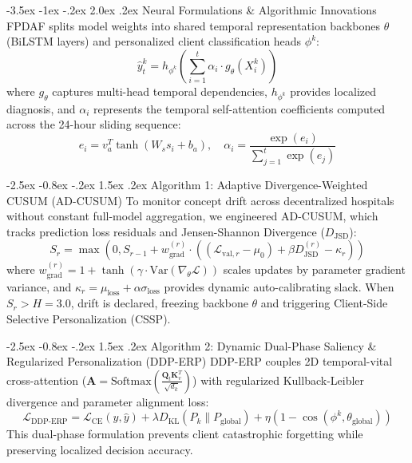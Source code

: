 \documentclass[11pt, a4paper]{article}
\makeatletter
\renewcommand\section{\@startsection {section}{1}{\z@}%
                                   {-3.5ex \@plus -1ex \@minus -.2ex}%
                                   {2.0ex \@plus.2ex}%
                                   {\normalfont\large\bfseries\color{amritaMaroon}}}
\renewcommand\subsection{\@startsection {subsection}{2}{\z@}%
                                   {-2.5ex \@plus -0.8ex \@minus -.2ex}%
                                   {1.5ex \@plus.2ex}%
                                   {\normalfont\normalsize\bfseries\color{slateNavy}}}
\makeatother
\begin{document}
\section{Neural Formulations \& Algorithmic Innovations}
FPDAF splits model weights into shared temporal representation backbones $\theta$ (BiLSTM layers) and personalized client classification heads $\phi^k$:
\begin{equation}
\hat{y}_t^k = h_{\phi^k} \left( \sum_{i=1}^{t} \alpha_i \cdot g_{\theta}(X_{i}^k) \right)
\end{equation}
where $g_{\theta}$ captures multi-head temporal dependencies, $h_{\phi^k}$ provides localized diagnosis, and $\alpha_i$ represents the temporal self-attention coefficients computed across the 24-hour sliding sequence:
\begin{equation}
e_i = v_a^T \tanh(W_s s_i + b_a), \quad \alpha_i = \frac{\exp(e_i)}{\sum_{j=1}^{t} \exp(e_j)}
\end{equation}

\subsection{Algorithm 1: Adaptive Divergence-Weighted CUSUM (AD-CUSUM)}
To monitor concept drift across decentralized hospitals without constant full-model aggregation, we engineered AD-CUSUM, which tracks prediction loss residuals and Jensen-Shannon Divergence ($D_{\text{JSD}}$):
\begin{equation}
S_r = \max\left(0, S_{r-1} + w_{\text{grad}}^{(r)} \cdot \left((\mathcal{L}_{\text{val}, r} - \mu_0) + \beta D_{\text{JSD}}^{(r)} - \kappa_r\right)\right)
\end{equation}
where $w_{\text{grad}}^{(r)} = 1 + \tanh(\gamma \cdot \text{Var}(\nabla_\theta \mathcal{L}))$ scales updates by parameter gradient variance, and $\kappa_r = \mu_{\text{loss}} + \alpha \sigma_{\text{loss}}$ provides dynamic auto-calibrating slack. When $S_r > H = 3.0$, drift is declared, freezing backbone $\theta$ and triggering Client-Side Selective Personalization (CSSP).

\subsection{Algorithm 2: Dynamic Dual-Phase Saliency \& Regularized Personalization (DDP-ERP)}
DDP-ERP couples 2D temporal-vital cross-attention ($\mathbf{A} = \text{Softmax}\left(\frac{\mathbf{Q}_t \mathbf{K}_v^T}{\sqrt{d_k}}\right)$) with regularized Kullback-Leibler divergence and parameter alignment loss:
\begin{equation}
\mathcal{L}_{\text{DDP-ERP}} = \mathcal{L}_{\text{CE}}(y, \hat{y}) + \lambda D_{\text{KL}}(P_k \parallel P_{\text{global}}) + \eta \left(1 - \cos(\phi^k, \theta_{\text{global}})\right)
\end{equation}
This dual-phase formulation prevents client catastrophic forgetting while preserving localized decision accuracy.
\end{document}
